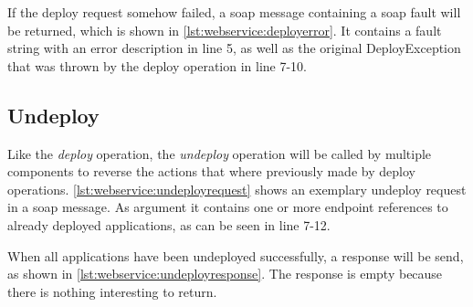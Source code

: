 \vspace*{\baselineskip}

If the deploy request somehow failed, a soap message containing a soap fault will be returned, which is shown in \autoref{lst:webservice:deployerror}.
It contains a fault string with an error description in line 5, as well as the original DeployException that was thrown by the deploy operation in line 7-10.

\vspace*{\baselineskip}

\subsection{Undeploy}

Like the \textit{deploy} operation, the \textit{undeploy} operation will be called by multiple components to reverse the actions that where previously made by deploy operations.
\autoref{lst:webservice:undeployrequest} shows an exemplary undeploy request in a soap message.
As argument it contains one or more endpoint references to already deployed applications, as can be seen in line 7-12.

\vspace*{\baselineskip}

When all applications have been undeployed successfully, a response will be send, as shown in \autoref{lst:webservice:undeployresponse}.
The response is empty because there is nothing interesting to return.

